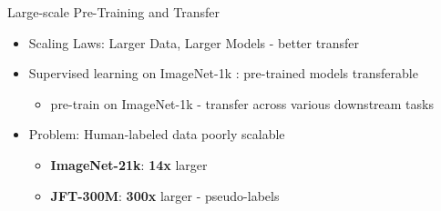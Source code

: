 \begin{frame}{Large-scale Pre-Training and Transfer}
\protect\hypertarget{large-scale-pre-training-and-transfer-3}{}
\begin{itemize}
\tightlist
\item
  Scaling Laws: Larger Data, Larger Models - better transfer
\item
  Supervised learning on ImageNet-1k : pre-trained models transferable

  \begin{itemize}
  \tightlist
  \item
    pre-train on ImageNet-1k - transfer across various downstream tasks
  \end{itemize}
\item
  Problem: Human-labeled data poorly scalable

  \begin{itemize}
  \tightlist
  \item
    \textbf{ImageNet-21k}: \textbf{14x} larger
  \item
    \textbf{JFT-300M}: \textbf{300x} larger - pseudo-labels
  \end{itemize}
\end{itemize}

\end{frame}

